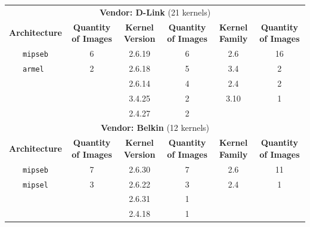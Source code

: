\begin{table}[H]
{\begin{tabular}{cccccc}
\multicolumn{6}{c}{\textbf{Vendor: D-Link} (21 kernels)}                                                                    \\
\textbf{Architecture} & \multicolumn{1}{c|}{\textbf{Quantity of Images}} & \textbf{Kernel Version} & \multicolumn{1}{c|}{\textbf{Quantity of Images}} & \textbf{Kernel Family} & \textbf{Quantity of Images} \\ \hline
{\tt mipseb}            & \multicolumn{1}{c|}{6}                & 2.6.19                 & \multicolumn{1}{c|}{6}                           & 2.6                     & 16                         \\
{\tt armel }            & \multicolumn{1}{c|}{2}                & 2.6.18                  & \multicolumn{1}{c|}{5}                          & 3.4                     & 2                          \\
                        & \multicolumn{1}{c|}{}                 & 2.6.14                  & \multicolumn{1}{c|}{4}                          & 2.4                     & 2                          \\
                        & \multicolumn{1}{c|}{}                 & 3.4.25                  & \multicolumn{1}{c|}{2}                          & 3.10                    & 1                          \\
                        & \multicolumn{1}{c|}{}                 & 2.4.27                  & \multicolumn{1}{c|}{2}                          &                         &                            \\ \hline

\multicolumn{6}{c}{\textbf{Vendor: Belkin} (12 kernels)}                                                                    \\
\textbf{Architecture} & \multicolumn{1}{c|}{\textbf{Quantity of Images}} & \textbf{Kernel Version} & \multicolumn{1}{c|}{\textbf{Quantity of Images}} & \textbf{Kernel Family} & \textbf{Quantity of Images} \\ \hline
{\tt mipseb}            & \multicolumn{1}{c|}{7}                & 2.6.30                  & \multicolumn{1}{c|}{7}                          & 2.6                     & 11                         \\
{\tt mipsel}            & \multicolumn{1}{c|}{3}                & 2.6.22                  & \multicolumn{1}{c|}{3}                          & 2.4                     & 1                          \\
                        & \multicolumn{1}{c|}{}                 & 2.6.31                  & \multicolumn{1}{c|}{1}                          &                         &                            \\
                        & \multicolumn{1}{c|}{}                 & 2.4.18                  & \multicolumn{1}{c|}{1}                          &                         &                            \\ \hline


\end{tabular}}
\end{table}
